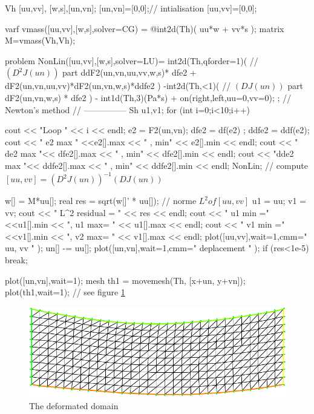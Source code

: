 \documentclass[twoside]{book}
\begin{document}
Vh [uu,vv], [w,s],[un,vn];
[un,vn]=[0,0];//  intialisation 
[uu,vv]=[0,0];

varf vmass([uu,vv],[w,s],solver=CG) =  @int2d(Th)( uu*w + vv*s );
matrix M=vmass(Vh,Vh);

problem NonLin([uu,vv],[w,s],solver=LU)=
 int2d(Th,qforder=1)( // $(D^2 J(un))$ part
               ddF2(un,vn,uu,vv,w,s)* dfe2 
	     + dF2(un,vn,uu,vv)*dF2(un,vn,w,s)*ddfe2        
	      )
   -int2d(Th,<1)( // $(D J(un))$ part
           dF2(un,vn,w,s) * dfe2  )
   - int1d(Th,3)(Pa*s) 
   + on(right,left,uu=0,vv=0);
;
// Newton's method
// ---------------
Sh u1,v1;
for (int i=0;i<10;i++)
{
  cout << "Loop " << i << endl;
  e2 = F2(un,vn);
  dfe2 = df(e2) ;
  ddfe2 = ddf(e2);
  cout << "  e2 max " <<e2[].max << " , min" << e2[].min << endl;
  cout << " de2 max "<< dfe2[].max << " , min" << dfe2[].min << endl;
  cout << "dde2 max "<< ddfe2[].max << " , min" << ddfe2[].min << endl;
  NonLin; //  compute $[uu,vv] = (D^2 J(un))^{-1}(D J(un))$
  
  w[]   = M*uu[];
  real res = sqrt(w[]' * uu[]); //  norme $ L^2 of [uu,vv]$
  u1 = uu;
  v1 = vv;
  cout << " L^2 residual = " << res << endl;
  cout << " u1 min =" <<u1[].min << ", u1 max= " << u1[].max << endl;
  cout << " v1 min =" <<v1[].min << ", v2 max= " << v1[].max << endl;
  plot([uu,vv],wait=1,cmm=" uu, vv " );
  un[] -= uu[]; 
  plot([un,vn],wait=1,cmm=" deplacement " );
  if (res<1e-5) break;
}

plot([un,vn],wait=1);
mesh th1 = movemesh(Th, [x+un, y+vn]);
plot(th1,wait=1); //  see figure \ref{fig nl-elas}
\eFF

\begin{figure}[hbt]
\begin{center}\includegraphics[width=16cm]{nl-elas}\end{center}
\caption{\label{fig nl-elas} The deformated domain}
\end{figure}
\end{document}
